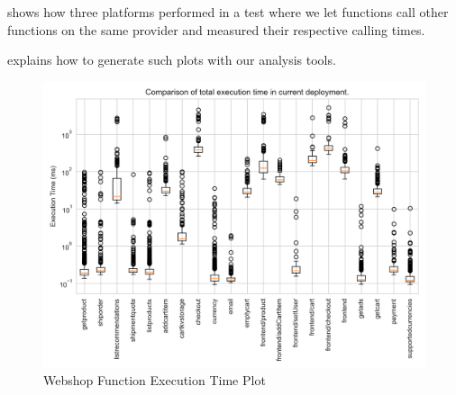 \documentclass[../main.tex]{subfiles}
\begin{document}
 shows how three platforms performed in a test where we let functions 
call other functions on the same provider and measured their respective calling times.

 explains how to generate such plots with our analysis tools.

\begin{figure}
\begin{center}
  \includegraphics[width=\linewidth,keepaspectratio]{./boxplot_function_execution_time.png}
\end{center}
\caption{Webshop Function Execution Time Plot}%
\label{fig:boxplot_function_execution_time}
\end{figure}
\end{document}
